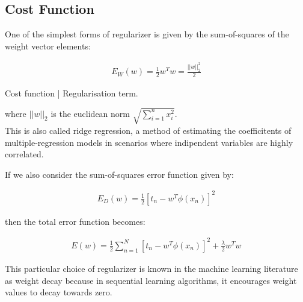 \subsection{Cost Function}
\label{subsec:regcostfun}

One of the simplest forms of regularizer is given by the sum-of-squares of the weight vector elements:
\begin{Equation}[H]
	\centering
	\begin{equation}\label{eq:regularizer}
		\begin{aligned}
			E_W(w) = \frac{1}{2} w^T w = \frac{||w||^2_2}{2}
		\end{aligned}
	\end{equation}
	\caption[Cost function | Regularisation term.]{Cost function | Regularisation term.}
\end{Equation}

\noindent where $||w||_2$ is the euclidean norm $\sqrt{ \sum_{i=1}^{n} x^2_i}$. \\

\noindent This is also called ridge regression, a method of estimating the coefficitents of multiple-regression models in scenarios where indipendent variables are highly correlated.

\noindent If we also consider the sum-of-squares error function given by:
\begin{Equation}[H]
	\centering
		\begin{equation} \label{eq:sumsqinverted}
			\begin{aligned}
				E_D(w) = \frac{1}{2} [t_n - w^T \phi(x_n)]^2
			\end{aligned}
		\end{equation}
	
\end{Equation}

\noindent then the total error function becomes:
\begin{Equation}[H]
	\centering
		\begin{equation} \label{eq:lossridgereg}
			\begin{aligned}
				E(w) = \frac{1}{2} \sum_{n=1}^{N}[t_n - w^T \phi(x_n)]^2 + \frac{\lambda}{2} w^T w
			\end{aligned}
		\end{equation}
		\caption[Loss Function for Ridge Regression]{This particular choice of regularizer is known in the machine learning literature as weight decay because in sequential learning algorithms, it encourages weight values to decay towards zero.}
\end{Equation}

